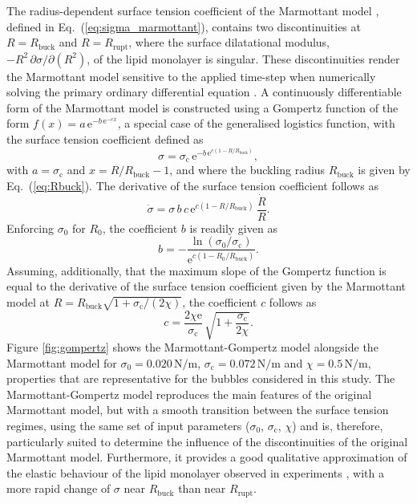The radius-dependent surface tension coefficient of the Marmottant model \citep{Marmottant2005}, defined in Eq.~(\ref{eq:sigma_marmottant}), contains two discontinuities at $R=R_\text{buck}$ and $R=R_\text{rupt}$, where the surface dilatational modulus, $-R^2 \, \partial\sigma/ \partial (R^2)$, of the lipid monolayer is singular. These discontinuities render the Marmottant model sensitive to the applied time-step when numerically solving the primary ordinary differential equation \citep{Versluis2020}. A continuously differentiable form of the Marmottant model is constructed using a Gompertz function of the form $f(x) = a \, \text{e}^{-b \, \text{e}^{-c x}}$, a special case of the generalised logistics function, with the surface tension coefficient defined as
\begin{equation}
\sigma = \sigma_\text{c} \, \text{e}^{-b \, \text{e}^{c (1-R/R_\text{buck})}}, \label{eq:sigma_gompertz}
\end{equation}
with $a = \sigma_\text{c}$ and $x = R/R_\text{buck}-1$, and where the buckling radius $R_\text{buck}$ is given by Eq.~(\ref{eq:Rbuck}). 
The derivative of the surface tension coefficient follows as
\begin{equation}
\dot{\sigma} = \sigma \, b \, c \, \text{e}^{c (1-R/R_\text{buck})} \, \frac{\dot{R}}{R}.
\end{equation}
Enforcing $\sigma_0$ for $R_0$, the coefficient $b$ is readily given as
\begin{equation}
b = - \frac{\ln (\sigma_0/\sigma_\text{c})}{\text{e}^{c(1-R_0/R_\text{buck})}}.
\end{equation}
Assuming, additionally, that the maximum slope of the Gompertz function is equal to the derivative of the surface tension coefficient given by the Marmottant model at $R = R_\text{buck} \sqrt{1+\sigma_\text{c}/(2 \chi)}$, the coefficient $c$ follows as
\begin{equation}
c = \frac{2  \chi  \text{e}}{\sigma_\text{c}} \, \sqrt{1+\frac{\sigma_\text{c}}{2 \chi}}.
\end{equation}
Figure \ref{fig:gompertz} shows the Marmottant-Gompertz model alongside the Marmottant model for $\sigma_0= 0.020 \, \text{N/m}$, $\sigma_\text{c} = 0.072 \, \text{N/m}$ and $\chi = 0.5 \, \text{N/m}$, properties that are representative for the bubbles considered in this study. The Marmottant-Gompertz model reproduces the main features of the original Marmottant model, but with a smooth transition between the surface tension regimes, using the same set of input parameters ($\sigma_0$, $\sigma_\text{c}$, $\chi$) and is, therefore, particularly suited to determine the influence of the discontinuities of the original Marmottant model. Furthermore, it provides a good qualitative approximation of the elastic behaviour of the lipid monolayer observed in experiments \citep{Segers2018}, with a more rapid change of $\sigma$ near $R_\text{buck}$ than near $R_\text{rupt}$.



